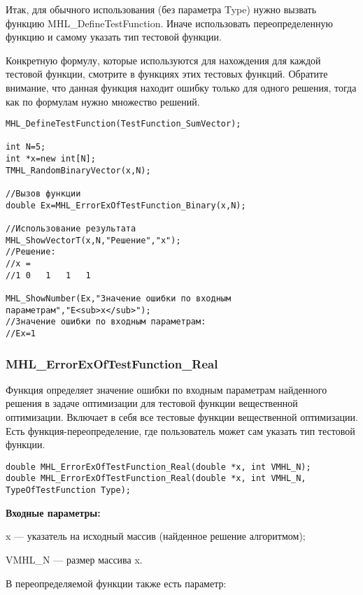 \documentclass[a4paper,12pt]{article}
\begin{document}
Итак, для обычного использования (без параметра Type) нужно вызвать функцию MHL\_DefineTestFunction. Иначе использовать переопределенную функцию и самому указать тип тестовой функции.

Конкретную формулу, которые используются для нахождения для каждой тестовой функции, смотрите в функциях этих тестовых функций. Обратите внимание, что данная функция находит ошибку только для одного решения, тогда как по формулам нужно множество решений.


\begin{lstlisting}[label=code_use_MHL_ErrorExOfTestFunction_Binary,caption=Пример использования]
MHL_DefineTestFunction(TestFunction_SumVector);

int N=5;
int *x=new int[N];
TMHL_RandomBinaryVector(x,N);

//Вызов функции
double Ex=MHL_ErrorExOfTestFunction_Binary(x,N);

//Использование результата
MHL_ShowVectorT(x,N,"Решение","x");
//Решение:
//x =	
//1	0	1	1	1

MHL_ShowNumber(Ex,"Значение ошибки по входным параметрам","E<sub>x</sub>");
//Значение ошибки по входным параметрам:
//Ex=1
\end{lstlisting}

\subsubsection{MHL\_ErrorExOfTestFunction\_Real}\label{MHL_ErrorExOfTestFunction_Real}

Функция определяет значение ошибки по входным параметрам найденного решения в задаче оптимизации для тестовой функции вещественной оптимизации. Включает в себя все тестовые функции вещественной оптимизации. Есть функция-переопределение, где пользователь может сам указать тип тестовой функции.


\begin{lstlisting}[label=code_syntax_MHL_ErrorExOfTestFunction_Real,caption=Синтаксис]
double MHL_ErrorExOfTestFunction_Real(double *x, int VMHL_N);
double MHL_ErrorExOfTestFunction_Real(double *x, int VMHL_N, TypeOfTestFunction Type);
\end{lstlisting}

\textbf{Входные параметры:}

x --- указатель на исходный массив (найденное решение алгоритмом);

VMHL\_N --- размер массива x.

В переопределяемой функции также есть параметр:
  
\end{document}
